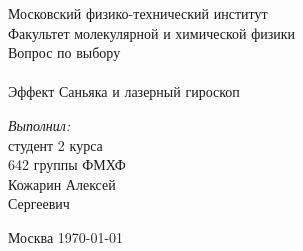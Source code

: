 \begin{titlepage}
\begin{center} 
 
\large Московский физико-технический институт\\
Факультет молекулярной и химической физики\\
\vspace{7cm}
\huge Вопрос по выбору \\\ \\ Эффект Саньяка и лазерный гироскоп
\end{center} 

\vspace{7.5cm}
{\par \raggedleft \large \emph{Выполнил:}\\ студент 2 курса\\ 642 группы ФМХФ\\ Кожарин Алексей\\ Сергеевич \par}
\begin{center}
\vfill Москва \today
\end{center}
\end{titlepage}
\newpage
\setcounter{page}{2}